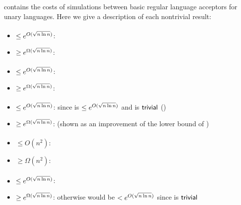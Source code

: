  contains the costs of simulations between basic regular language acceptors for unary languages.
Here we give a description of each nontrivial result:

\paragraph{\ONFA{}\tto\ODFA}
\begin{itemize}
	\item $\le e^{O(\sqrt{n\ln n})}$: \cite{Chr86}
	\item $\ge e^{\Omega(\sqrt{n\ln n})}$: \cite{Chr86}
\end{itemize}
\paragraph{\TDFA{}\tto\ODFA}\label{cost:2DFAto1DFAu}
\begin{itemize}
	\item $\le e^{O(\sqrt{n\ln n})}$: \cite{Chr86}
	\item $\ge e^{\Omega(\sqrt{n\ln n})}$: \cite{Chr86}
\end{itemize}
\paragraph{\TDFA{}\tto\ONFA}\label{cost:2DFAto1NFAu}
\begin{itemize}
	\item $\le e^{O(\sqrt{n\ln n})}$: since \hyperref[cost:2DFAto1DFAu]{\TDFA{}\tto\ODFA} is $\le e^{O(\sqrt{n\ln n})}$ and \ODFA{}\tto\ONFA is $\mathsf{trivial}$ (\cite{Chr86})
	\item $\ge e^{\Omega(\sqrt{n\ln n})}$: \cite{Chr86} (shown as an improvement of the lower bound of \hyperref[cost:2DFAto1DFAu]{\TDFA{}\tto\ODFA})
\end{itemize}
\paragraph{\ONFA{}\tto\TDFA}\label{cost:1NFAto2DFAu}
\begin{itemize}
	\item $\le O(n^2)$: \cite{Chr86}
	\item $\ge \Omega(n^2)$: \cite{Chr86}
\end{itemize}
\paragraph{\TNFA{}\tto\ODFA}\label{cost:2NFAto1DFAu}
\begin{itemize}
	\item $\le e^{O(\sqrt{n\ln n})}$: \cite{MerPig01}
	\item $\ge e^{\Omega(\sqrt{n\ln n})}$: otherwise \hyperref[cost:2DFAto1DFAu]{\TDFA{}\tto\ODFA} would be $<e^{O(\sqrt{n\ln n})}$ since \TDFA{}\tto\TNFA is $\mathsf{trivial}$
\end{itemize}
